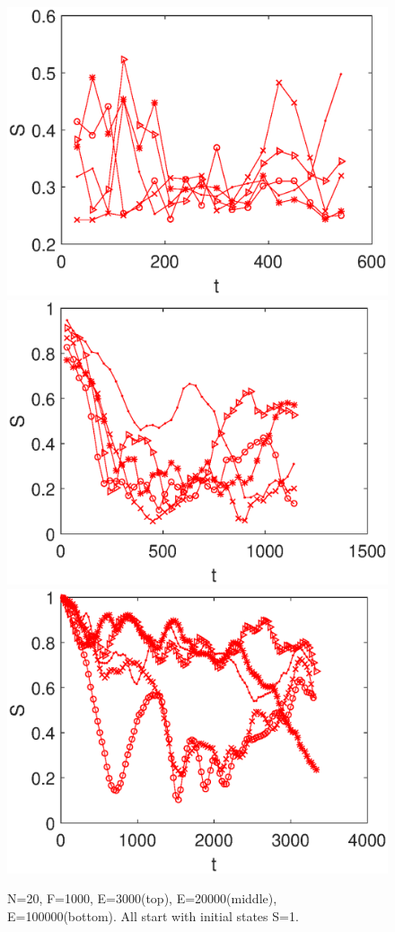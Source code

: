 \documentclass[aps,pre,twocolumn,groupedaddress]{revtex4-1}
\begin{document}
\begin{figure}
\centering
\includegraphics[scale=0.4]{ZhiyuPictures/N=20_shape_F=1000_E=3000.eps}
\includegraphics[scale=0.4]{ZhiyuPictures/N=20_shape_F=1000_E=20000.eps}
\includegraphics[scale=0.4]{ZhiyuPictures/N=20_shape_F=1000_E=100000.eps}
\caption{N=20, F=1000, E=3000(top), E=20000(middle), E=100000(bottom). All start with initial states S=1. \label{fig:shape}}
\end{figure}
\end{document}
